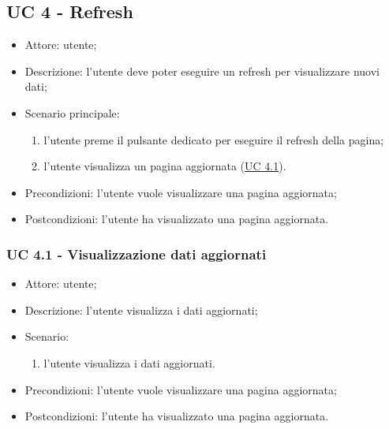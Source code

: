     \subsection{UC 4 - Refresh} \label{sec: UC 4}
    \begin{itemize}
        \item Attore: utente;
        \item Descrizione: l'utente deve poter eseguire un refresh per visualizzare nuovi dati;
        \item Scenario principale:
            \begin{enumerate}
            \item l'utente preme il pulsante dedicato per eseguire il refresh della pagina;
            \item l'utente visualizza un pagina aggiornata (\hyperref[sec: UC 4.1]{UC 4.1}).
            \end{enumerate}
        \item Precondizioni: l'utente vuole visualizzare una pagina aggiornata;
        \item Postcondizioni: l'utente ha visualizzato una pagina aggiornata.
    \end{itemize}

    \subsubsection{UC 4.1 - Visualizzazione dati aggiornati} \label{sec: UC 4.1}
    \begin{itemize}
        \item Attore: utente;
        \item Descrizione: l'utente visualizza i dati aggiornati;
        \item Scenario:
        \begin{enumerate}
        \item l'utente visualizza i dati aggiornati.
        \end{enumerate}
        \item Precondizioni: l'utente vuole visualizzare una pagina aggiornata;
        \item Postcondizioni: l'utente ha visualizzato una pagina aggiornata.
    \end{itemize}



